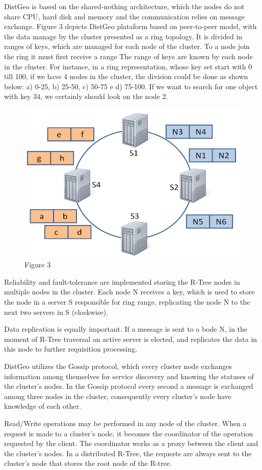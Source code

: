 	DistGeo is based on the shared-nothing architecture, which the nodes do not share CPU, hard disk and memory and the communication relies on message exchange. Figure 3 depicts DistGeo plataform based on peer-to-peer model, with the data manage by the cluster presented as a ring topology. It is divided in ranges of keys, which are managed for each node of the cluster. To a node join the ring it must first receive a range
	The range of keys are known by each node in the cluster. For instance, in a ring representation, whose key set start with 0 till 100, if we have 4 nodes in the cluster, the division could be done as shown below: a) 0-25, b) 25-50, c) 50-75 e d) 75-100. If we want to search for one object with key 34, we certainly should look on the node 2.

\begin{figure}[ht]
\centering
\includegraphics[width=.5\textwidth]{figure3.png}
\caption{Figure 3}
\label{fig: Figure 3}
\end{figure}

	Reliability and fault-tolerance are implemented storing the R-Tree nodes in multiple nodes in the cluster. Each node N receives a key, which is used to store the node in a server S responsible for ring range, replicating the node N to the next two servers in S (clockwise).
	
	Data replication is equally important. If a message is sent to a bode N, in the moment of R-Tree traversal an active server is elected, and replicates the data in this node to further requisition processing.
	
	DistGeo utilizes the Gossip protocol, which every cluster node exchanges information among themselves for service discovery and knowing the statuses of the cluster's nodes. In the Gossip protocol every second a message is exchanged among three nodes in the cluster, consequently every cluster's node have knowledge of each other.
	
	Read/Write operations may be performed in any node of the cluster. When a request is made to a cluster's node, it becomes the coordinator of the operation requested by the client. The coordinator works as a proxy between the client and the cluster's nodes. In a distributed R-Tree, the requests are always sent to the cluster's node that stores the root node of the R-tree.